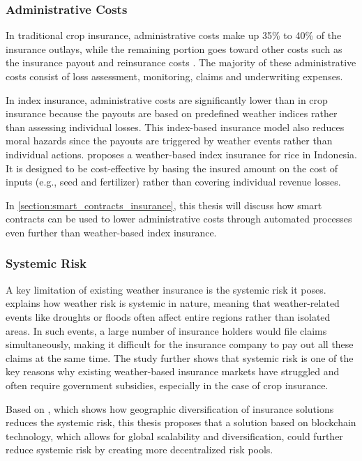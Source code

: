 \subsubsection{Administrative Costs}
In traditional crop insurance, administrative costs make up 35\% to 40\% of the insurance outlays, while the remaining portion goes toward other costs such as the insurance payout and reinsurance costs \autocite{glauber2004crop}. The majority of these administrative costs consist of loss assessment, monitoring, claims and underwriting expenses.
 
In index insurance, administrative costs are significantly lower than in crop insurance because the payouts are based on predefined weather indices rather than assessing individual losses. This index-based insurance model also reduces moral hazards since the payouts are triggered by weather events rather than individual actions. \textcite{kusuma2018viable} proposes a weather-based index insurance for rice in Indonesia. It is designed to be cost-effective by basing the insured amount on the cost of inputs (e.g., seed and fertilizer) rather than covering individual revenue losses.
 
In \cref{section:smart_contracts_insurance}, this thesis will discuss how smart contracts can be used to lower administrative costs through automated processes even further than weather-based index insurance.
 
\subsubsection{Systemic Risk}\label{systemic_risk}
A key limitation of existing weather insurance is the systemic risk it poses. \textcite{xu2010systemic} explains how weather risk is systemic in nature, meaning that weather-related events like droughts or floods often affect entire regions rather than isolated areas. In such events, a large number of insurance holders would file claims simultaneously, making it difficult for the insurance company to pay out all these claims at the same time. The study further shows that systemic risk is one of the key reasons why existing weather-based insurance markets have struggled and often require government subsidies, especially in the case of crop insurance.
 
Based on \textcite{salgueiro2021diversification}, which shows how geographic diversification of insurance solutions reduces the systemic risk, this thesis proposes that a solution based on blockchain technology, which allows for global scalability and diversification, could further reduce systemic risk by creating more decentralized risk pools.
 

